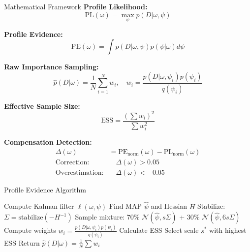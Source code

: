 \documentclass[final,hyperref={pdfpagelabels=false}]{beamer}
\begin{document}
\begin{frame}[t]
\begin{columns}[t,totalwidth=\textwidth]
\begin{column}{0.32\textwidth}
\begin{block}{Mathematical Framework}
\textbf{Profile Likelihood:}
\begin{equation}
\mathrm{PL}(\omega) = \max_{\psi} p(D|\omega,\psi)
\end{equation}

\textbf{Profile Evidence:}
\begin{equation}
\mathrm{PE}(\omega) = \int p(D|\omega,\psi) p(\psi|\omega) d\psi
\end{equation}

\textbf{Raw Importance Sampling:}
\begin{equation}
\hat{p}(D|\omega) = \frac{1}{N}\sum_{i=1}^N w_i, \quad w_i = \frac{p(D|\omega,\psi_i)p(\psi_i)}{q(\psi_i)}
\end{equation}

\textbf{Effective Sample Size:}
\begin{equation}
\mathrm{ESS} = \frac{(\sum w_i)^2}{\sum w_i^2}
\end{equation}

\textbf{Compensation Detection:}
\begin{align}
\Delta(\omega) &= \mathrm{PE}_{\text{norm}}(\omega) - \mathrm{PL}_{\text{norm}}(\omega)\\
\text{Correction:} &\quad \Delta(\omega) > 0.05\\
\text{Overestimation:} &\quad \Delta(\omega) < -0.05
\end{align}

\end{block}

\begin{exampleblock}{Profile Evidence Algorithm}
\footnotesize
\begin{algorithmic}[1]
\STATE Compute Kalman filter $\ell(\omega, \psi)$
\STATE Find MAP $\hat{\psi}$ and Hessian $H$ 
\STATE Stabilize: $\Sigma = \text{stabilize}(-H^{-1})$
    \STATE Sample mixture: 70\% $\mathcal{N}(\hat{\psi}, s\Sigma)$ + 30\% $\mathcal{N}(\hat{\psi}, 6s\Sigma)$
    \STATE Compute weights $w_i = \frac{p(D|\omega,\psi_i)p(\psi_i)}{q(\psi_i)}$
    \STATE Calculate ESS
\ENDFOR
\STATE Select scale $s^*$ with highest ESS
\STATE Return $\hat{p}(D|\omega) = \frac{1}{N}\sum w_i$
\end{algorithmic}
\end{exampleblock}


\end{column}
\end{columns}
\end{frame}
\end{document}
